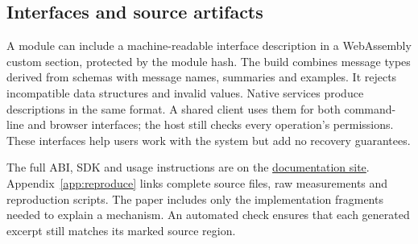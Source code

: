 
\subsection{Interfaces and source artifacts}\label{sec:tools}

A module can include a machine-readable interface description in a
WebAssembly custom section, protected by the module hash. The build
combines message types derived from schemas with message names,
summaries and examples. It rejects incompatible data structures and
invalid values. Native services produce descriptions in the same format.
A shared client uses them for both command-line and browser interfaces;
the host still checks every operation's permissions. These interfaces
help users work with the system but add no recovery guarantees.

The full ABI, SDK and usage instructions are on the
\href{https://cklukas.github.io/paglets/cpp/}{documentation site}.
Appendix~\ref{app:reproduce} links complete source files, raw measurements
and reproduction scripts. The paper includes only the implementation
fragments needed to explain a mechanism. An automated check ensures that
each generated excerpt still matches its marked source region.
